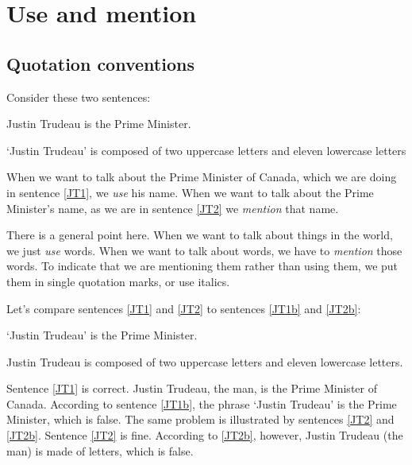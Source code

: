 

\chapter{Use and mention}\label{s:UseMention}

\section{Quotation conventions}
Consider these two sentences:
	\begin{earg}
		\item[\ex{JT1}] Justin Trudeau is the Prime Minister.
		\item[\ex{JT2}] `Justin Trudeau' is composed of two uppercase letters and eleven lowercase letters
	\end{earg}
When we want to talk about the Prime Minister of Canada, which we are doing in sentence \ref{JT1}, we \textit{use} his name. When we want to talk about the Prime Minister's name, as we are in sentence \ref{JT2} we \emph{mention} that name.

There is a general point here. When we want to talk about things in the world, we just \emph{use} words. When we want to talk about words, we have to \emph{mention} those words. To indicate that we are mentioning them rather than using them, we put them in single quotation marks, or use italics. 

Let's compare sentences \ref{JT1} and \ref{JT2} to sentences \ref{JT1b} and \ref{JT2b}:
	\begin{earg}
		\item[\ex{JT1b}] `Justin Trudeau' is the Prime Minister.
		\item[\ex{JT2b}] Justin Trudeau is composed of two uppercase letters and eleven lowercase letters.
	\end{earg}
Sentence \ref{JT1} is correct. Justin Trudeau, the man, is the Prime Minister of Canada. According to sentence \ref{JT1b}, the phrase `Justin Trudeau' is the Prime Minister, which is false. The same problem is illustrated by sentences \ref{JT2} and \ref{JT2b}. Sentence \ref{JT2} is fine. According to \ref{JT2b}, however, Justin Trudeau (the man) is made of letters, which is false. 



